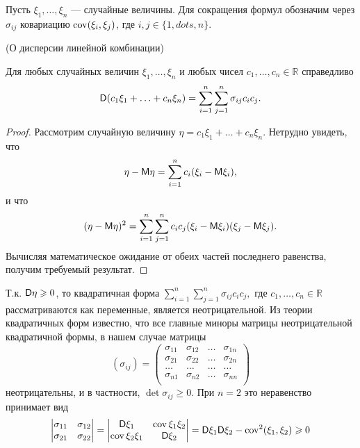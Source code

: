 Пусть $\xi_1,\dots, \xi_n$ — случайные величины. Для сокращения формул обозначим через $\sigma_{ij}$ ковариацию $\operatorname{cov}(\xi_i, \xi_j)$, где $i, j \in \{1, dots, n\}.$

\begin{lemma}
	(О дисперсии линейной комбинации)

	Для любых случайных величин $\xi_1,\dots , \xi_n$ и любых чисел $c_1,\dots, c_n \in \mathbb{R}$ справедливо
	\begin{equation*}
		\mathsf{D}(c_1 \xi_1+\ldots+c_n \xi_n)=\sum_{i=1}^n\sum_{j=1}^n\sigma_{ij}c_ic_j.
	\end{equation*}
\end{lemma}

\begin{proof}
	Рассмотрим случайную величину $\eta = c_1 \xi_1 +\dots+ c_n \xi_n$.
	Нетрудно увидеть, что
	\begin{equation*}
		\eta-\mathsf{M}\eta=\sum_{i=1}^nc_i(\xi_i-\mathsf{M} \xi_i),
	\end{equation*}
	и что
	\begin{equation*}
		(\eta-\mathsf{M}\eta)^2=\sum_{i=1}^n\sum_{j=1}^nc_ic_j(\xi_i-\mathsf{M} \xi_i)(\xi_j-\mathsf{M} \xi_j).
	\end{equation*}
	Вычисляя математическое ожидание от обеих частей последнего равенства,
	получим требуемый результат.
\end{proof}

\begin{remark}\label{rem:19.5}
	Т.к. $\mathsf{D}\eta \geqslant 0$, то квадратичная форма $\sum_{i=1}^n\sum_{j=1}^n\sigma_{ij}c_ic_j,$ где $c_1,\dots, c_n \in \mathbb{R}$ рассматриваются как переменные, является неотрицательной. Из теории квадратичных форм известно, что все главные миноры матрицы неотрицательной квадратичной формы, в нашем случае матрицы
	\begin{equation*}
		(\sigma_{ij})=	
		\begin{pmatrix}
	  		\sigma_{11}& \sigma_{12}& \ldots & \sigma_{1n}\\
	  		\sigma_{21}& \sigma_{22}& \ldots & \sigma_{2n} \\
	  		\ldots & \ldots& \ldots & \ldots \\
	  		\sigma_{n1}& \sigma_{n2}& \ldots & \sigma_{nn}\\
		\end{pmatrix}
	\end{equation*}
	неотрицательны, и в частности, $\det\sigma_{ij} \geqslant 0$. При $n = 2$ это неравенство принимает вид
	\begin{equation*}
		\begin{vmatrix}
			\sigma_{11}& \sigma_{12}\\
		 	\sigma_{21}& \sigma_{22}\\
		\end{vmatrix}
		=
		\begin{vmatrix}
			\mathsf{D} \xi_1 & \operatorname{cov}{\xi_1 \xi_2}\\
			\operatorname{cov}{\xi_2 \xi_1} & \mathsf{D} \xi_2\\
		\end{vmatrix}
		=\mathsf{D} \xi_1 \mathsf{D} \xi_2-\operatorname{cov}^2(\xi_1, \xi_2)\geqslant 0		
	\end{equation*}
\end{remark}

